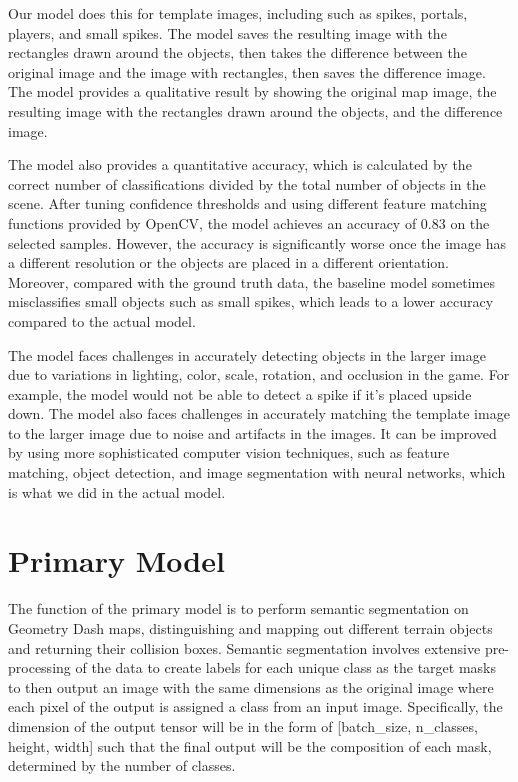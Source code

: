 \documentclass{article} %
\begin{document}
Our model does this for template images, including such as spikes, portals, players, and small spikes. The model saves the resulting image with the rectangles drawn around the objects, then takes the difference between the original image and the image with rectangles, then saves the difference image. The model provides a qualitative result by showing the original map image, the resulting image with the rectangles drawn around the objects, and the difference image. 

The model also provides a quantitative accuracy, which is calculated by the correct number of classifications divided by the total number of objects in the scene. After tuning confidence thresholds and using different feature matching functions provided by OpenCV, the model achieves an accuracy of 0.83 on the selected samples. However, the accuracy is significantly worse once the image has a different resolution or the objects are placed in a different orientation. Moreover, compared with the ground truth data, the baseline model sometimes misclassifies small objects such as small spikes, which leads to a lower accuracy compared to the actual model.

The model faces challenges in accurately detecting objects in the larger image due to variations in lighting, color, scale, rotation, and occlusion in the game. For example, the model would not be able to detect a spike if it's placed upside down. The model also faces challenges in accurately matching the template image to the larger image due to noise and artifacts in the images. It can be improved by using more sophisticated computer vision techniques, such as feature matching, object detection, and image segmentation with neural networks, which is what we did in the actual model.






\section{Primary Model}
The function of the primary model is to perform semantic segmentation on Geometry Dash maps, distinguishing and mapping out different terrain objects and returning their collision boxes. Semantic segmentation involves extensive pre-processing of the data to create labels for each unique class as the target masks to then output an image with the same dimensions as the original image where each pixel of the output is assigned a class from an input image. Specifically, the dimension of the output tensor will be in the form of [batch\_size, n\_classes, height, width] such that the final output will be the composition of each mask, determined by the number of classes.
\end{document}
